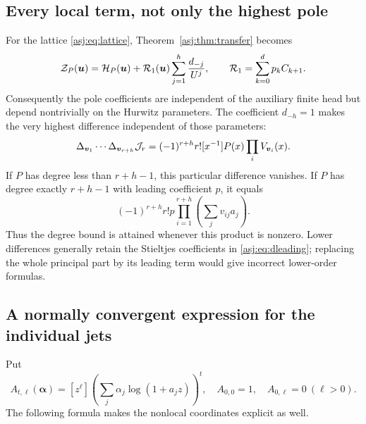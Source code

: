 \subsection{Every local term, not only the highest pole}
For the lattice \eqref{asj:eq:lattice}, Theorem~\ref{asj:thm:transfer} becomes
\begin{equation}\label{asj:eq:Hurwitzgerm}
 \mathcal Z_P(\boldsymbol u)
  =\mathcal H_P(\boldsymbol u)
     +\mathcal R_1(\boldsymbol u)\sum_{j=1}^h\frac{d_{-j}}{U^j},
 \qquad \mathcal R_1=\sum_{k=0}^d p_k C_{k+1}.
\end{equation}
Consequently the pole coefficients are independent of the auxiliary
finite head but depend nontrivially on the Hurwitz parameters. The
coefficient $d_{-h}=1$ makes the very highest difference independent of
those parameters:
\begin{equation}\label{asj:eq:Hurwitztop}
 \Delta_{\boldsymbol v_1}\cdots\Delta_{\boldsymbol v_{r+h}}
 \mathcal J_r
 =(-1)^{r+h}r![x^{-1}]P(x)\prod_iV_{\boldsymbol v_i}(x).
\end{equation}
If $P$ has degree less than $r+h-1$, this particular difference vanishes.
If $P$ has degree exactly $r+h-1$ with leading coefficient $p$, it equals
\begin{equation}\label{asj:eq:Hurwitzsharp}
 (-1)^{r+h}r!p\prod_{i=1}^{r+h}\left(\sum_jv_{ij}a_j\right).
\end{equation}
Thus the degree bound is attained whenever this product is nonzero.
Lower differences generally retain the Stieltjes coefficients in
\eqref{asj:eq:dleading}; replacing the whole principal part by its leading
term would give incorrect lower-order formulas.

\subsection{A normally convergent expression for the individual jets}
Put
\[
 A_{t,\ell}(\boldsymbol\alpha)
   =[z^\ell]\left(\sum_j\alpha_j\log(1+a_jz)\right)^t,
 \quad A_{0,0}=1,\quad A_{0,\ell}=0\ (\ell>0).
\]
The following formula makes the nonlocal coordinates explicit as well.

